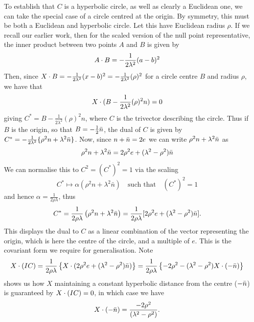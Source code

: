 To establish that $C$ is a hyperbolic circle, as well as
clearly a Euclidean one, we can take the special case of a circle
centred at the origin. By symmetry, this must be both a Euclidean
and hyperbolic circle. Let this have Euclidean radius $\rho$.
If we recall our earlier work, then for the scaled version of the
null point representative, the inner product between two points
$A$ and $B$ is given by
%
\begin{equation}
     A\cdot B = -\frac{1}{2\lambda^2}(a-b)^2
     \end{equation}
%
Then, since $X\cdot B = -\frac{1}{2\lambda^2}(x-b)^2 =
-\frac{1}{2\lambda^2}(\rho)^2$ for a circle centre $B$ and radius
$\rho$, we have that
%
\begin{equation}
  X\cdot (B-\frac{1}{2\lambda^2}(\rho)^2n)=0
\end{equation}
%
giving $C^*=B-\frac{1}{2\lambda^2}(\rho)^2n$, where $C$ is the
trivector describing the circle. Thus if $B$ is the origin, so
that $B = -\frac{1}{2}\bar{n}$, the dual of $C$ is given by $C^* =
-\frac{1}{2\lambda^2}\{\rho^2 n + \lambda^2\bar{n}\}$. Now, since
$n+\bar{n} = 2e$ we can write $\rho^2 n + \lambda^2\bar{n}$ as
%
\begin{equation} \label{eqn:dual-to-C}
\rho^2 n + \lambda^2 \bar{n} = 2 \rho^2 e + (\lambda^2 -
\rho^2) \bar{n}
\end{equation}
%
We can normalise this to $C^2=(C^{*})^2=1$ via the scaling
\[C^* \mapsto \alpha(\rho^2n + \lambda^2\bar{n})\quad\mbox{such that}
\quad(C^{*})^2 = 1
\]
and hence $\alpha = \frac{1}{2\rho\lambda}$, thus
\begin{equation}
C^* = \frac{1}{2 \rho \lambda} \left(\rho^2 n + \lambda^2 
\bar{n}\right)
		=
\frac{1}{2\rho\lambda}[2\rho^2e + (\lambda^2 - \rho^2)\bar{n}].
\end{equation}
%
This displays the dual to $C$ as a linear combination of
the vector representing the origin, which is here the
centre of the circle, and a multiple of $e$. This is the
covariant form we require for generalisation. Note
%
%
\begin{equation}
X \cdot (IC) = \frac{1}{2 \rho \lambda} \left\{ X \cdot (2 \rho^2 e +
(\lambda^2 - \rho^2) \bar{n}) \right\} = \frac{1}{2 \rho \lambda}
\left\{ -2\rho^2 -(\lambda^2-\rho^2) X \cdot (-\bar{n}) \right\}
\end{equation}
%
shows us how $X$ maintaining a constant hyperbolic distance
from the centre ($-\bar{n}$) is guaranteed by $X \cdot (IC)=0$, in which
case we have
%
\begin{equation}
X \cdot (-\bar{n}) = \frac{-2\rho^2}{(\lambda^2 - \rho^2)}.
\end{equation}
